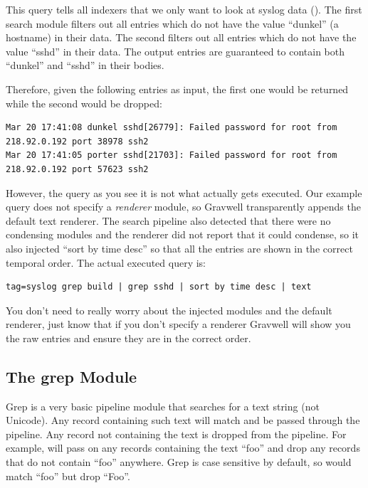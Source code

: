 
This query tells all indexers that we only want to look at syslog
data (). The first  search module filters out all entries which do not
have the value ``dunkel'' (a hostname) in their data. The second  filters out all
entries which do not have the value ``sshd'' in their data. The output
entries are guaranteed to contain both ``dunkel'' and ``sshd'' in their
bodies.

Therefore, given the following entries as input, the first one would be returned while the second would be dropped:

\begin{Verbatim}[breaklines=true]
Mar 20 17:41:08 dunkel sshd[26779]: Failed password for root from 218.92.0.192 port 38978 ssh2
Mar 20 17:41:05 porter sshd[21703]: Failed password for root from 218.92.0.192 port 57623 ssh2
\end{Verbatim}

However, the query as you see it is not what actually gets executed.
Our example query does not specify a \emph{renderer} module, so Gravwell
transparently appends the default text renderer. The search pipeline
also detected that there were no condensing modules and the renderer did
not report that it could condense, so it also injected ``sort by time
desc'' so that all the entries are shown in the correct temporal order.
The actual executed query is:

\begin{Verbatim}[breaklines=true]
tag=syslog grep build | grep sshd | sort by time desc | text
\end{Verbatim}

You don't need to really worry about the injected modules and the
default renderer, just know that if you don't specify a renderer
Gravwell will show you the raw entries and ensure they are in the
correct order.

\subsection{The grep Module}
\label{sec:grep}
Grep is a very basic pipeline module that searches for a text string (not Unicode). Any record containing such text will match and be passed through the pipeline. Any record not containing the text is dropped from the pipeline. For example,  will pass on any records containing the text ``foo'' and drop any records that do not contain ``foo'' anywhere. Grep is case sensitive by default, so  would match ``foo'' but drop ``Foo''.

